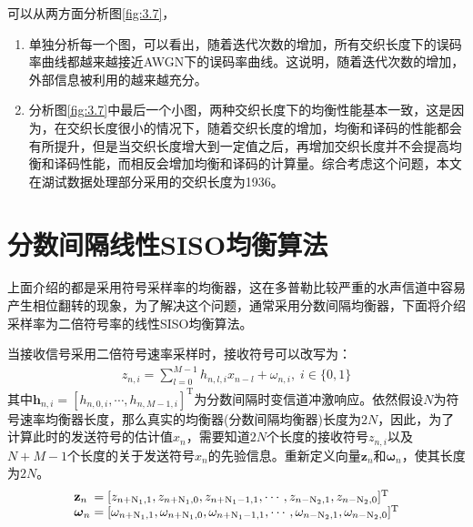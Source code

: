 可以从两方面分析图\ref{fig:3.7}，
\begin{enumerate}
    \item
        单独分析每一个图，可以看出，随着迭代次数的增加，所有交织长度下的误码率曲线都越来越接近AWGN下的误码率曲线。这说明，随着迭代次数的增加，外部信息被利用的越来越充分。
    \item
        分析图\ref{fig:3.7}中最后一个小图，两种交织长度下的均衡性能基本一致，这是因为，在交织长度很小的情况下，随着交织长度的增加，均衡和译码的性能都会有所提升，但是当交织长度增大到一定值之后，再增加交织长度并不会提高均衡和译码性能，而相反会增加均衡和译码的计算量。综合考虑这个问题，本文在湖试数据处理部分采用的交织长度为1936。
\end{enumerate}

\section{分数间隔线性SISO均衡算法}
上面介绍的都是采用符号采样率的均衡器，这在多普勒比较严重的水声信道中容易产生相位翻转的现象，为了解决这个问题，通常采用分数间隔均衡器，下面将介绍采样率为二倍符号率的线性SISO均衡算法。

当接收信号采用二倍符号速率采样时，接收符号可以改写为：
\begin{eqnarray}
    z_{n,i}=\sum_{l=0}^{M-1}h_{n,l,i}x_{n-l}+\omega_{n,i},\;i\in\{0,1\}
    \label{equ:3.38}
\end{eqnarray}
其中$\mathbf{h}_{n,i}=[h_{n,0,i},\cdots,h_{n,M-1,i}]^{\mathrm{T}}$为分数间隔时变信道冲激响应。依然假设$N$为符号速率均衡器长度，那么真实的均衡器(分数间隔均衡器)长度为$2N$，因此，为了计算此时的发送符号的估计值$\hat{x}_n$，需要知道$2N$个长度的接收符号$z_{n,i}$以及$N+M-1$个长度的关于发送符号$x_n$的先验信息。重新定义向量$\mathbf{z}_n$和$\boldsymbol{\omega}_n$，使其长度为$2N$。
\begin{eqnarray}
    \begin{array}{l@{\;=\;}l}
        \mathbf{z}_n&[z_{n+\mathrm{N}_1,1},z_{n+\mathrm{N}_1,0},z_{n+\mathrm{N}_1-1,1},\cdots,z_{n-\mathrm{N}_2,1},z_{n-\mathrm{N}_2,0}]^{\mathrm{T}}\\
        \boldsymbol{\omega}_n&[\omega_{n+\mathrm{N}_1,1},\omega_{n+\mathrm{N}_1,0},\omega_{n+\mathrm{N}_1-1,1},\cdots,\omega_{n-\mathrm{N}_2,1},\omega_{n-\mathrm{N}_2,0}]^{\mathrm{T}}
    \end{array}
    \label{equ:3.39}
\end{eqnarray}

